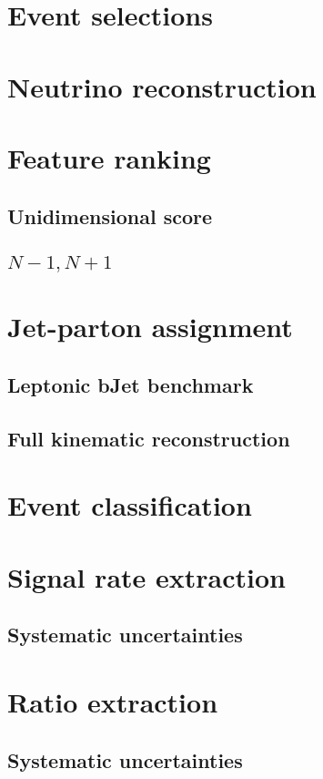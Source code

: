 \section{Event selections}
\section{Neutrino reconstruction}
\section{Feature ranking}
\subsection{Unidimensional score}
\subsection{{$N-1,N+1$}}
\section{Jet-parton assignment}
\subsection{Leptonic bJet benchmark}
\subsection{Full kinematic reconstruction}

\section{Event classification}

\section{Signal rate extraction}
\subsection{Systematic uncertainties}
\section{Ratio extraction}
\subsection{Systematic uncertainties}
